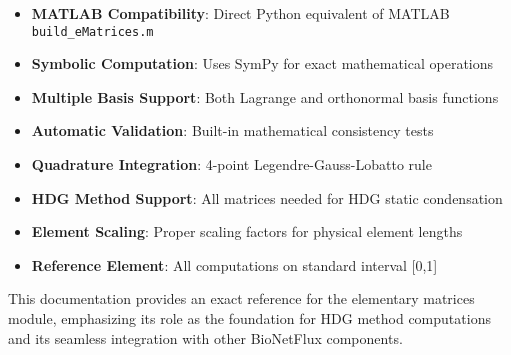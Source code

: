 \begin{itemize}
    \item \textbf{MATLAB Compatibility}: Direct Python equivalent of MATLAB \texttt{build\_eMatrices.m}
    \item \textbf{Symbolic Computation}: Uses SymPy for exact mathematical operations
    \item \textbf{Multiple Basis Support}: Both Lagrange and orthonormal basis functions
    \item \textbf{Automatic Validation}: Built-in mathematical consistency tests
    \item \textbf{Quadrature Integration}: 4-point Legendre-Gauss-Lobatto rule
    \item \textbf{HDG Method Support}: All matrices needed for HDG static condensation
    \item \textbf{Element Scaling}: Proper scaling factors for physical element lengths
    \item \textbf{Reference Element}: All computations on standard interval [0,1]
\end{itemize}

This documentation provides an exact reference for the elementary matrices module, emphasizing its role as the foundation for HDG method computations and its seamless integration with other BioNetFlux components.

